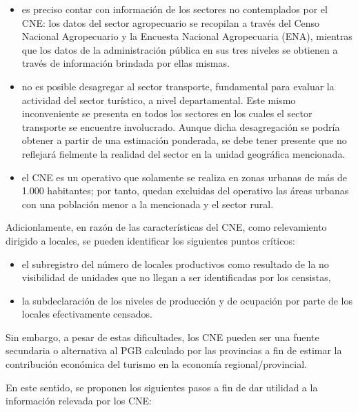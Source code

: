 \documentclass[
  openany]{book}
\providecommand{\tightlist}{%
  \setlength{\itemsep}{0pt}\setlength{\parskip}{0pt}}
\begin{document}
\begin{itemize}
\tightlist
\item
  es preciso contar con información de los sectores no contemplados por el CNE: los datos del sector agropecuario se recopilan a través del Censo Nacional Agropecuario y la Encuesta Nacional Agropecuaria (ENA), mientras que los datos de la administración pública en sus tres niveles se obtienen a través de información brindada por ellas mismas.
\item
  no es posible desagregar al sector transporte, fundamental para evaluar la actividad del sector turístico, a nivel departamental. Este mismo inconveniente se presenta en todos los sectores en los cuales el sector transporte se encuentre involucrado. Aunque dicha desagregación se podría obtener a partir de una estimación ponderada, se debe tener presente que no reflejará fielmente la realidad del sector en la unidad geográfica mencionada.
\item
  el CNE es un operativo que solamente se realiza en zonas urbanas de más de 1.000 habitantes; por tanto, quedan excluidas del operativo las áreas urbanas con una población menor a la mencionada y el sector rural.
\end{itemize}

Adicionlamente, en razón de las características del CNE, como relevamiento dirigido a locales, se pueden identificar los siguientes puntos críticos:

\begin{itemize}
\tightlist
\item
  el subregistro del número de locales productivos como resultado de la no visibilidad de unidades que no llegan a ser identificadas por los censistas,
\item
  la subdeclaración de los niveles de producción y de ocupación por parte de los locales efectivamente censados.
\end{itemize}

Sin embargo, a pesar de estas dificultades, los CNE pueden ser una fuente secundaria o alternativa al PGB calculado por las provincias a fin de estimar la contribución económica del turismo en la economía regional/provincial.

En este sentido, se proponen los siguientes pasos a fin de dar utilidad a la información relevada por los CNE:
\end{document}

